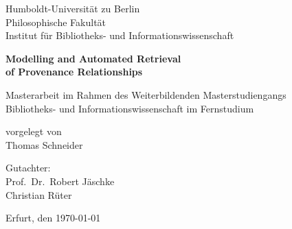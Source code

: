 \thispagestyle{plain}
\begin{titlepage}

  \begin{center}
  
    \vspace*{1cm}
    Humboldt-Universität zu Berlin \\
    Philosophische Fakultät \\
    Institut für Bibliotheks- und Informationswissenschaft
  
    \vspace*{\fill}
    {\Huge\bfseries\sffamily
      Modelling and Automated Retrieval \\[6pt]
      of Provenance Relationships
    }
    
    \vspace*{\fill}
    Masterarbeit im Rahmen des Weiterbildenden Masterstudiengangs\\
    Bibliotheks- und Informationswissenschaft im Fernstudium
    
    \vspace*{\fill}
    vorgelegt von \\
    Thomas Schneider
    
    \vspace*{\fill}
    Gutachter: \\
    Prof.\ Dr.\ Robert Jäschke \\
    Christian Rüter
    
    \vspace*{\fill}
    Erfurt, den \today
    
    \vspace*{1cm}
    
  
  \end{center}
  

\end{titlepage}